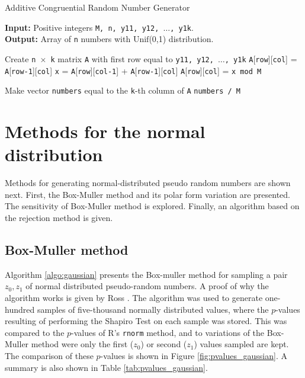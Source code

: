 \documentclass[letterpaper, 10 pt, conference]{article}
\begin{document}
\begin{algorithm}
	\caption{Additive Congruential Random Number Generator}
	\begin{flushleft}
		\textbf{Input: } Positive integers \texttt{M, n, y11, y12, $\dots$, y1k}.
		\\ \textbf{Output: } Array of \texttt{n} numbers with $\mathrm{Unif}$(0,1) distribution.
	\end{flushleft}
	
	\begin{algorithmic}[1]
		\State Create \texttt{n $\times$ k} matrix \texttt{A} with first row equal to \texttt{y11, y12, $\dots$, y1k}
					\State \texttt{A}[\texttt{row}][\texttt{col}] = \texttt{A}[\texttt{row-1}][\texttt{col}]
				\Else
					\State \texttt{x} = \texttt{A}[\texttt{row}][\texttt{col-1}] + \texttt{A}[\texttt{row-1}][\texttt{col}]	
					\State \texttt{A}[\texttt{row}][\texttt{col}] = \texttt{x mod M}
				\EndIf
			\EndFor
		\EndFor
		
		\State Make vector \texttt{numbers} equal to the \texttt{k}-th column of  \texttt{A}
		\State \Return \texttt{numbers / M}
	\end{algorithmic}
	\label{algo:acorn}
\end{algorithm}

\section{Methods for the normal distribution}
Methods for generating normal-distributed pseudo random numbers are shown next. First, the Box-Muller method and its polar form variation are presented. The sensitivity of Box-Muller method is explored. Finally, an algorithm based on the rejection method \cite{Ross_2006} is given. 

\subsection{Box-Muller method}
Algorithm \ref{algo:gaussian} presents the Box-muller method for sampling a pair $z_0, z_1$ of normal distributed pseudo-random numbers. A proof of why the algorithm works is given by Ross \cite{Ross_2000}. The algorithm was used to generate one-hundred samples of five-thousand normally distributed values, where the $p$-values resulting of performing the Shapiro Test on each sample was stored. This was compared to the $p$-values of R's \texttt{rnorm} method, and to variations of the Box-Muller method were only the first ($z_0$) or second ($z_1$) values sampled are kept. The comparison of these $p$-values is shown in Figure \ref{fig:pvalues_gaussian}. A summary is also shown in Table \ref{tab:pvalues_gaussian}.
\end{document}
